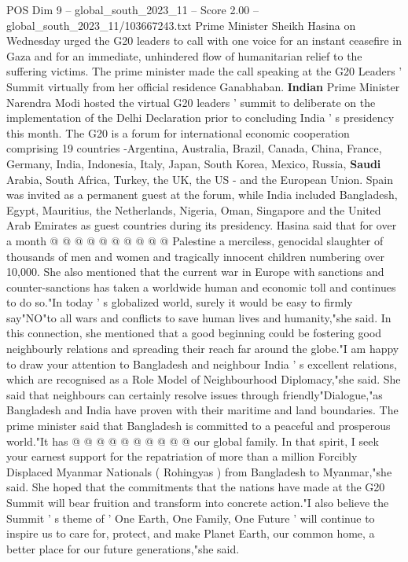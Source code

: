 \begin{textsample}{POS Dim 9 – global\_south\_2023\_11 – Score 2.00 – global\_south\_2023\_11/103667243.txt}  \label{ex:f9_pos_130}
Prime Minister Sheikh Hasina on Wednesday urged the G20 leaders to call with one voice for an instant ceasefire in Gaza and for an immediate, unhindered flow of humanitarian relief to the suffering victims.
The prime minister made the call speaking at the G20 Leaders ' Summit virtually from her official residence Ganabhaban. \textbf{Indian} Prime Minister Narendra Modi hosted the virtual G20 leaders ' summit to deliberate on the implementation of the Delhi Declaration prior to concluding India ' s presidency this month.
The G20 is a forum for international economic cooperation comprising 19 countries -Argentina, Australia, Brazil, Canada, China, France, Germany, India, Indonesia, Italy, Japan, South Korea, Mexico, Russia, \textbf{Saudi} Arabia, South Africa, Turkey, the UK, the US - and the European Union.
Spain was invited as a permanent guest at the forum, while India included Bangladesh, Egypt, Mauritius, the Netherlands, Nigeria, Oman, Singapore and the United Arab Emirates as guest countries during its presidency.
Hasina said that for over a month @ @ @ @ @ @ @ @ @ @ Palestine a merciless, genocidal slaughter of thousands of men and women and tragically innocent children numbering over 10,000.
She also mentioned that the current war in Europe with sanctions and counter-sanctions has taken a worldwide human and economic toll and continues to do so."In today ' s globalized world, surely it would be easy to firmly say"NO"to all wars and conflicts to save human lives and humanity,"she said.
In this connection, she mentioned that a good beginning could be fostering good neighbourly relations and spreading their reach far around the globe."I am happy to draw your attention to Bangladesh and neighbour India ' s excellent relations, which are recognised as a Role Model of Neighbourhood Diplomacy,"she said.
She said that neighbours can certainly resolve issues through friendly"Dialogue,"as Bangladesh and India have proven with their maritime and land boundaries.
The prime minister said that Bangladesh is committed to a peaceful and prosperous world."It has @ @ @ @ @ @ @ @ @ @ our global family.
In that spirit, I seek your earnest support for the repatriation of more than a million Forcibly Displaced Myanmar Nationals ( Rohingyas ) from Bangladesh to Myanmar,"she said.
She hoped that the commitments that the nations have made at the G20 Summit will bear fruition and transform into concrete action."I also believe the Summit ' s theme of ' One Earth, One Family, One Future ' will continue to inspire us to care for, protect, and make Planet Earth, our common home, a better place for our future generations,"she said.

\end{textsample}

